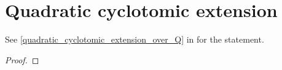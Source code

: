 \section{Quadratic cyclotomic extension}\label{proof: quadratic_cyclotomic_extension_over_Q}

See \cref{quadratic_cyclotomic_extension_over_Q} in  for the statement.
\begin{proof}
    
\end{proof}